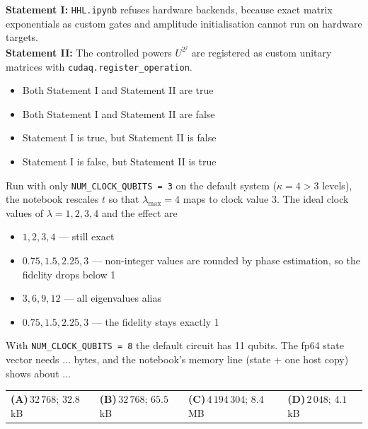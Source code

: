 \documentclass[11pt,a4paper]{article}
\newcommand{\optlabel}[1]{\textbf{(#1)}}
\newenvironment{qitem}[1]{\begin{list}{}{\setlength{\leftmargin}{3.3em}\setlength{\labelwidth}{3.1em}%
  \setlength{\labelsep}{0.2em}\setlength{\topsep}{3pt}\setlength{\parsep}{3pt}}\item[\textbf{Q.#1}\hfill]}{\end{list}}
\newcommand{\qsep}{\par\vspace{2pt}{\color{black!15}\hrule}\vspace{4pt}}
\begin{document}
\begin{qitem}{74}
\textbf{Statement I:} \texttt{HHL.ipynb} refuses hardware backends, because exact matrix exponentials as custom gates and amplitude initialisation cannot run on hardware targets.\\[1mm]
\textbf{Statement II:} The controlled powers $U^{2^j}$ are registered as custom unitary matrices with \texttt{cudaq.register\_operation}.
\begin{itemize}[leftmargin=2.6em, labelsep=0.4em, itemsep=2pt, topsep=3pt]
\item[\optlabel{A}] Both Statement I and Statement II are true
\item[\optlabel{B}] Both Statement I and Statement II are false
\item[\optlabel{C}] Statement I is true, but Statement II is false
\item[\optlabel{D}] Statement I is false, but Statement II is true
\end{itemize}
\end{qitem}
\qsep

\begin{qitem}{75}
Run with only \texttt{NUM\_CLOCK\_QUBITS = 3} on the default system ($\kappa = 4 > 3$ levels), the notebook rescales $t$ so that $\lambda_{\max} = 4$ maps to clock value 3. The ideal
clock values of $\lambda = 1, 2, 3, 4$ and the effect are
\begin{itemize}[leftmargin=2.6em, labelsep=0.4em, itemsep=2pt, topsep=3pt]
\item[\optlabel{A}] $1, 2, 3, 4$ --- still exact
\item[\optlabel{B}] $0.75, 1.5, 2.25, 3$ --- non-integer values are rounded by phase estimation, so the fidelity drops below 1
\item[\optlabel{C}] $3, 6, 9, 12$ --- all eigenvalues alias
\item[\optlabel{D}] $0.75, 1.5, 2.25, 3$ --- the fidelity stays exactly 1
\end{itemize}
\end{qitem}
\qsep

\begin{qitem}{76}
With \texttt{NUM\_CLOCK\_QUBITS = 8} the default circuit has 11 qubits. The fp64 state vector needs ... bytes, and the notebook's memory line (state + one host copy) shows about ...
\par\smallskip\noindent\begin{tabularx}{\linewidth}{@{}*{4}{L}@{}}
\optlabel{A}\,$32\,768$; $32.8$ kB & \optlabel{B}\,$32\,768$; $65.5$ kB & \optlabel{C}\,$4\,194\,304$; $8.4$ MB & \optlabel{D}\,$2\,048$; $4.1$ kB
\end{tabularx}
\end{qitem}
\qsep
\end{document}
